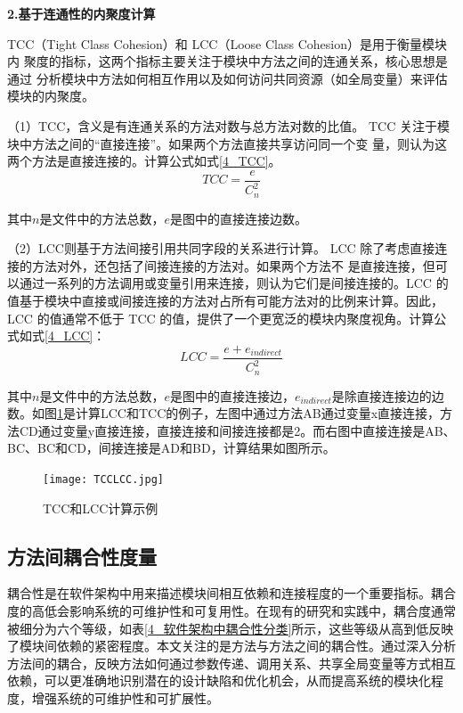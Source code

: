 \noindent \textbf{2.基于连通性的内聚度计算}

TCC（Tight Class Cohesion）和 LCC（Loose Class Cohesion）是用于衡量模块内
聚度的指标，这两个指标主要关注于模块中方法之间的连通关系，核心思想是通过
分析模块中方法如何相互作用以及如何访问共同资源（如全局变量）来评估模块的内聚度。

（1）TCC，含义是有连通关系的方法对数与总方法对数的比值\cite{1995Cohesion}。
TCC 关注于模块中方法之间的“直接连接”。如果两个方法直接共享访问同一个变
量，则认为这两个方法是直接连接的。计算公式如式\ref{4_TCC}。
\begin{equation}
\label{4_TCC}
{TCC} = \frac{e}{C_{n}^{2}}
\end{equation}

其中\(n\)是文件中的方法总数，\(e\)是图中的直接连接边数。

（2）LCC则基于方法间接引用共同字段的关系进行计算\cite{1995Cohesion}。
LCC 除了考虑直接连接的方法对外，还包括了间接连接的方法对。如果两个方法不
是直接连接，但可以通过一系列的方法调用或变量引用来连接，则认为它们是间接连接的。LCC 的值基于模块中直接或间接连接的方法对占所有可能方法对的比例来计算。因此，LCC 的值通常不低于 TCC 的值，提供了一个更宽泛的模块内聚度视角。计算公式如式\ref{4_LCC}：
\begin{equation}
\label{4_LCC}
{LCC=\frac{e+e_{indirect}}{C_{n}^{2}}}
\end{equation}

其中\(n\)是文件中的方法总数，\(e\)是图中的直接连接边，\(e_{indirect}\)是除直接连接边的边数。如图\ref{4_TCC和LCC计算示例}是计算LCC和TCC的例子，左图中通过方法AB通过变量x直接连接，方法CD通过变量y直接连接，直接连接和间接连接都是2。而右图中直接连接是AB、BC、BC和CD，间接连接是AD和BD，计算结果如图所示。

\begin{figure}[h]
\centering
\texttt{[image: TCCLCC.jpg]}
\caption{TCC和LCC计算示例}
\label{4_TCC和LCC计算示例}
\end{figure}


\subsection{方法间耦合性度量}

耦合性是在软件架构中用来描述模块间相互依赖和连接程度的一个重要指标。耦合度的高低会影响系统的可维护性和可复用性。在现有的研究和实践中，耦合度通常被细分为六个等级\cite{DNZS200722064}，如表\ref{4_软件架构中耦合性分类}所示，这些等级从高到低反映了模块间依赖的紧密程度。本文关注的是方法与方法之间的耦合性。通过深入分析方法间的耦合，反映方法如何通过参数传递、调用关系、共享全局变量等方式相互依赖，可以更准确地识别潜在的设计缺陷和优化机会，从而提高系统的模块化程度，增强系统的可维护性和可扩展性。

